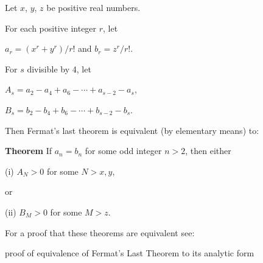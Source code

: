 \documentclass{article}
\begin{document}
Let $x$, $y$, $z$ be positive real numbers.

For each positive integer $r$, let

$a_r = (x^r+y^r)/r!$ and $b_r=z^r/r!$.

For $s$ divisible by 4, let

$A_s=a_2-a_4+a_6- \cdots +a_{s-2}-a_s$,

$B_s=b_2-b_4+b_6- \cdots +b_{s-2}-b_s$.

Then Fermat's last theorem is equivalent (by elementary means) to: 

{\bf Theorem} If $a_n=b_n$ for some odd integer $n>2$, then either

(i) $A_N > 0$ for some $N>x,y$,

\hspace{2mm} or

(ii) $B_M>0$ for some $M>z$.

For a proof that these theorems are equivalent see:

proof of equivalence of Fermat's Last Theorem to its analytic form
\end{document}
